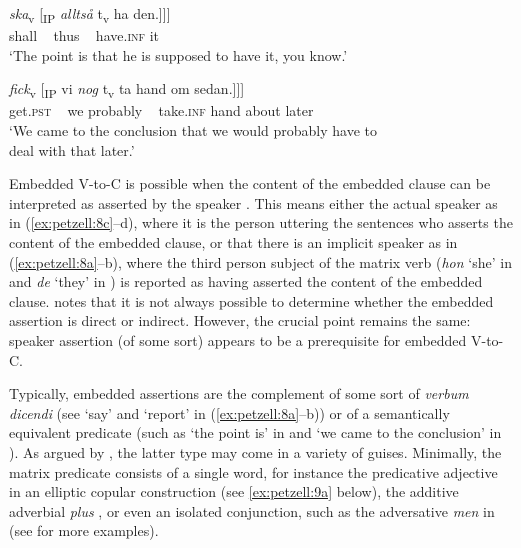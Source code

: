 \documentclass[output=paper,colorlinks,citecolor=brown,draft,draftmode]{langscibook}
\begin{document}
\gll     \textit{{ska}}\textsubscript{v}      [\textsubscript{IP} \textit{{alltså}}  t\textsubscript{v}    ha        den.]]]  \\
    shall     ~     thus   ~    have.\textsc{inf}    it\\
\glt `The point is that he is supposed to have it, you know.’  \\

\ex{\label{ex:petzell:8d}
\gll Vi    drog      slutsatsen [\textsubscript{CP}    att [\textsubscript{CP}     den\\
    we    draw.\textsc{pst}  conclusion.\textsc{def} ~ that    ~   it   \\}

\gll     \textit{{fick}}\textsubscript{v} [\textsubscript{IP}  vi    \textit{{nog}} t\textsubscript{v}     ta      hand  om    sedan.]]]  \\
    get.\textsc{pst} ~ we    probably ~ take.\textsc{inf}  hand   about    later\\
\glt `We came to the conclusion that we would probably have to   \\
    deal with that later.’
\z
\z


Embedded V-to-C is possible when the content of the embedded clause can be interpreted as asserted by the speaker \citep[21]{Andersson1975}. This means either the actual speaker as in (\ref{ex:petzell:8c}–d), where it is the person uttering the sentences who asserts the content of the embedded clause, or that there is an implicit speaker as in (\ref{ex:petzell:8a}–b), where the third person subject of the matrix verb (\textit{hon} ‘she’ in  and \textit{de} ‘they’ in ) is reported as having asserted the content of the embedded clause. \citet[164–167]{Julien2015} notes that it is not always possible to determine whether the embedded assertion is direct or indirect. However, the crucial point remains the same: speaker assertion (of some sort) appears to be a prerequisite for embedded V-to-C.\largerpage



Typically, embedded assertions are the complement of some sort of \textit{verbum dicendi} (see ‘say’ and ‘report’ in (\ref{ex:petzell:8a}–b)) or of a semantically equivalent predicate (such as ‘the point is’ in  and ‘we came to the conclusion’ in ). As argued by \citet{Julien2009}, the latter type may come in a variety of guises. Minimally, the matrix predicate consists of a single word, for instance the predicative adjective in an elliptic copular construction (see \ref{ex:petzell:9a} below), the additive adverbial \textit{plus} , or even an isolated conjunction, such as the adversative \textit{men} in  (see \citealt{Lyngfelt2003} for more examples).
\end{document}
